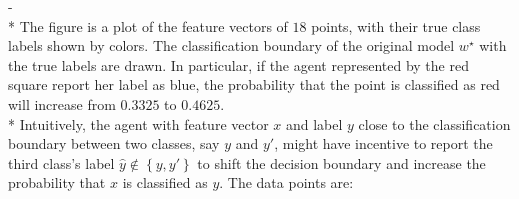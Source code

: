 \documentclass{article}
\begin{document}
 -
\\* The figure is a plot of the feature vectors of $18$ points, with their true class labels shown by colors. The classification boundary of the original model $w^\star $ with the true labels are drawn. In particular, if the agent represented by the red square report her label as blue, the probability that the point is classified as red will increase from $0.3325$ to $0.4625$.
\\* Intuitively, the agent with feature vector $x $ and label $y $ close to the classification boundary between two classes, say $y $ and $y'$, might have incentive to report the third class's label $\hat{y} \notin \left\{y , y'\right\}$ to shift the decision boundary and increase the probability that $x $ is classified as $y. $
\newline \newline
The data points are:
\end{document}
